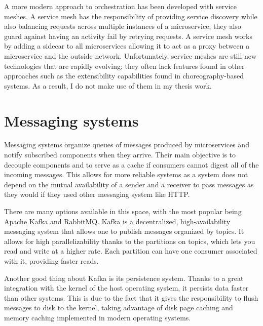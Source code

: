 A more modern approach to orchestration has been developed with service meshes.\parencite{servicemesh} A service mesh has the responsibility of providing service discovery while also balancing requests across multiple instances of a microservice; they also guard against having an activity fail by retrying requests. A service mesh works by adding a sidecar to all microservices allowing it to act as a proxy between a microservice and the outside network. Unfortunately, service meshes are still new technologies that are rapidly evolving; they often lack features found in other approaches such as the extensibility capabilities found in choreography-based systems. As a result, I do not make use of them in my thesis work.



\section{Messaging systems}

Messaging systems organize queues of messages produced by microservices and notify subscribed components  when they arrive. Their main objective is to  decouple components and to serve as a cache if consumers cannot digest all of the incoming messages. This allows for more reliable systems as a system does not depend on the mutual availability of a sender and a receiver to pass messages as they would if they used other messaging system like HTTP.

There are many options available in this space, with the most popular being Apache Kafka and RabbitMQ. Kafka is a decentralized, high-availability messaging system that allows one to publish messages organized by topics. It allows for high parallelizability thanks to the partitions on topics, which lets you read and write at a higher rate. Each partition can have one consumer associated with it, providing faster reads. 

Another good thing about Kafka is its persistence system. Thanks to a great integration with the kernel of the host operating system, it persists data faster than other systems. This is due to the fact that it gives the responsibility to flush messages to disk to the kernel, taking advantage of disk page caching and memory caching implemented in modern operating systems.

